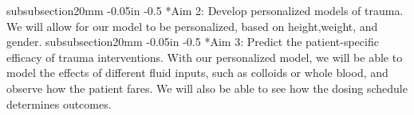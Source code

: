 \documentclass[11pt]{article}
\makeatletter
\renewcommand\subsubsection{\@startsection
	{subsubsection}{2}{0mm}
	{-0.05in}
	{-0.5\baselineskip}
	{\normalfont\normalsize\bfseries}}
\makeatother
\begin{document}
\subsubsection*{Aim 2: Develop personalized models of trauma. }
We will allow for our model to be personalized, based on height,weight, and gender. 
\subsubsection*{Aim 3: Predict the patient-specific efficacy of trauma interventions.} With our personalized model, we will be able to model the effects of different fluid inputs, such as colloids or whole blood, and observe how the patient fares. We will also be able to see how the dosing schedule determines outcomes.

%
\end{document}
